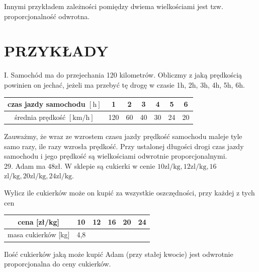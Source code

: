 \documentclass[10pt]{article}
\begin{document}
Innymi przykładem zależności pomiędzy dwiema wielkościami jest tzw. proporcjonalność odwrotna.

\section*{PRZYKŁADY}
I. Samochód ma do przejechania 120 kilometrów. Obliczmy z jaką prędkością powinien on jechać, jeżeli ma przebyć tę drogę w czasie 1h, 2h, 3h, 4h, 5h, 6h.

\begin{center}
\begin{tabular}{c|c|c|c|c|c|c}
czas jazdy samochodu \([\mathrm{h}]\) & 1 & 2 & 3 & 4 & 5 & 6 \\
\hline
średnia prędkość \([\mathrm{km} / \mathrm{h}]\) & 120 & 60 & 40 & 30 & 24 & 20 \\
\hline
\end{tabular}
\end{center}

Zauważmy, że wraz ze wzrostem czasu jazdy prędkość samochodu maleje tyle samo razy, ile razy wzrosła prędkość. Przy ustalonej długości drogi czas jazdy samochodu i jego prędkość są wielkościami odwrotnie proporcjonalnymi.\\
29. Adam ma \(48 \mathrm{zł}\). W sklepie są cukierki w cenie \(10 \mathrm{zl} / \mathrm{kg}, 12 \mathrm{zl} / \mathrm{kg}, 16\) \(\mathrm{zl} / \mathrm{kg}, 20 \mathrm{zl} / \mathrm{kg}, 24 \mathrm{zl} / \mathrm{kg}\).

Wylicz ile cukierków może on kupić za wszystkie oszczędności, przy każdej z tych cen

\begin{center}
\begin{tabular}{c|c|c|c|c|c|}
cena [zł/kg] & 10 & 12 & 16 & 20 & 24 \\
\hline
masa cukierków [kg] & 4,8 &  &  &  &  \\
\hline
\end{tabular}
\end{center}

Ilość cukierków jaką może kupić Adam (przy stałej kwocie) jest odwrotnie proporcjonalna do ceny cukierków.
\end{document}
